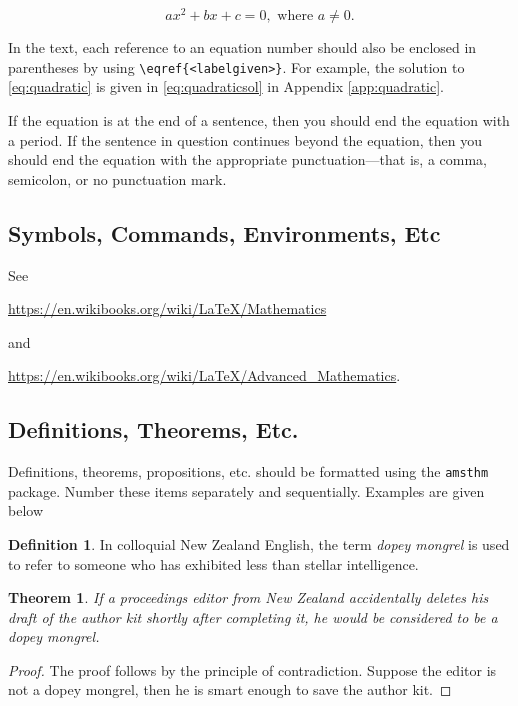 \documentclass[a4paper,11pt]{article}
\theoremstyle{plain}
\newtheorem{theorem}{Theorem}
\theoremstyle{definition}
\newtheorem{definition}{Definition}
\begin{document}
\begin{equation} \label{eq:quadratic}
ax^2 + bx + c = 0, \mbox{ where } a \ne 0.
\end{equation}

In the text, each reference to an equation number should also be enclosed in
parentheses by using \verb+\eqref{<labelgiven>}+.
For example, the solution to \eqref{eq:quadratic} is given
in \eqref{eq:quadraticsol} in Appendix \ref{app:quadratic}.

If the equation is at the end of a sentence, then you should end the equation
with a period. If the sentence in question continues beyond the equation,
then you should end the equation with the appropriate
punctuation---that is, a comma, semicolon, or no punctuation mark.

\subsection{Symbols, Commands, Environments, Etc}
See

\url{https://en.wikibooks.org/wiki/LaTeX/Mathematics}

\noindent
and

\url{https://en.wikibooks.org/wiki/LaTeX/Advanced_Mathematics}.


\subsection{Definitions, Theorems, Etc.}
Definitions, theorems, propositions, etc. should be formatted
using the \texttt{amsthm} package.
Number these items separately and sequentially. Examples are given below

\begin{definition}
In colloquial New Zealand English, the term \textit{dopey mongrel} is used
to refer to someone who has exhibited less than stellar intelligence.
\end{definition}

\begin{theorem}\label{t:delete}
If a proceedings editor from New Zealand accidentally deletes his draft of
the author kit shortly after completing it, he would be considered to be a dopey mongrel.
\end{theorem}
\begin{proof}
The proof follows by the principle of contradiction.
Suppose the editor is not a dopey mongrel, then he is smart enough to save
the author kit.
\end{proof}
\end{document}
